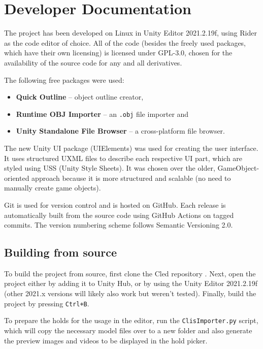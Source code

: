\section{Developer Documentation}\label{sec:progdoc}

The project has been developed on Linux in Unity Editor 2021.2.19f, using Rider as the code editor of choice.
All of the code (besides the freely used packages, which have their own licensing) is licensed under GPL-3.0, chosen for the availability of the source code for any and all derivatives.

The following free packages were used:

\begin{itemize}
	\item \textbf{Quick Outline} \cite{quickoutline} -- object outline creator,
	\item \textbf{Runtime OBJ Importer} \cite{objimport} -- an \verb|.obj| file importer and
	\item \textbf{Unity Standalone File Browser} \cite{unitystandalonefilebrowser} -- a cross-platform file browser.
\end{itemize}

The new Unity UI package (UIElements) was used for creating the user interface.
It uses structured UXML files to describe each respective UI part, which are styled using USS (Unity Style Sheets).
It was chosen over the older, GameObject-oriented approach because it is more structured and scalable (no need to manually create game objects).

Git is used for version control and is hosted on GitHub.
Each release is automatically built from the source code using GitHub Actions on tagged commits.
The version numbering scheme follows Semantic Versioning 2.0.

\subsection{Building from source}
To build the project from source, first clone the Cled repository \cite{cled}.
Next, open the project either by adding it to Unity Hub, or by using the Unity Editor 2021.2.19f (other 2021.x versions will likely also work but weren't tested).
Finally, build the project by pressing \verb|Ctrl+B|.

To prepare the holds for the usage in the editor, run the \verb|ClisImporter.py| script, which will copy the necessary model files over to a new folder and also generate the preview images and videos to be displayed in the hold picker.

